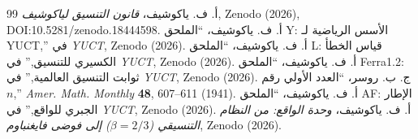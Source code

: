 \documentclass[12pt,a4paper]{article}
\begin{document}
	\begin{thebibliography}{99}
		أ. ف. ياكوشيف، \emph{قانون التنسيق لياكوشيف}, Zenodo (2026), DOI:10.5281/zenodo.18444598.
		أ. ف. ياكوشيف، ``الملحق Y: الأسس الرياضية لـ YUCT,'' في \emph{YUCT}, Zenodo (2026).
		أ. ف. ياكوشيف، ``الملحق L: قياس الخطأ الكسيري للتنسيق,'' في \emph{YUCT}, Zenodo (2026).
		أ. ف. ياكوشيف، ``الملحق Ferra1.2: ثوابت التنسيق العالمية,'' في \emph{YUCT}, Zenodo (2026).
		ج. ب. روسر، ``العدد الأولي رقم $n$,'' \emph{Amer. Math. Monthly} \textbf{48}, 607--611 (1941).
		أ. ف. ياكوشيف، ``الملحق AF: الإطار الجبري للواقع,'' في \emph{YUCT}, Zenodo (2026).
		أ. ف. ياكوشيف، \emph{وحدة الواقع: من النظام التنسيقي (\(\beta=2/3\)) إلى فوضى فايغنباوم}, Zenodo (2026).
	\end{thebibliography}
	
\end{document}
